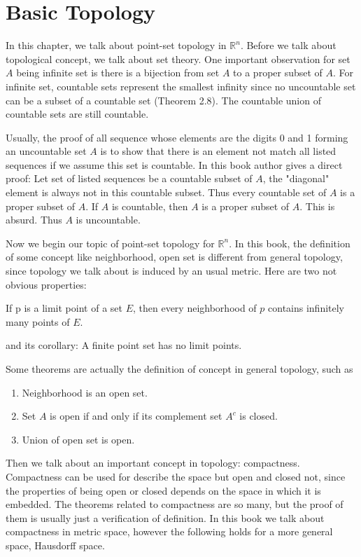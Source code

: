 \chapter{Basic Topology}
In this chapter, we talk about point-set topology in $\mathbb{R}^n$. Before we talk about topological concept, we talk about set theory. One important observation for set $A$ being infinite set is there is a bijection from set $A$ to a proper subset of $A$. For infinite set, countable sets represent the smallest infinity since no uncountable set can be a subset of a countable set (Theorem 2.8). The countable union of countable sets are still countable.\par
Usually, the proof of all sequence whose elements are the digits 0 and 1 forming an uncountable set $A$ is to show that there is an element not match all listed sequences if we assume this set is countable. In this book author gives a direct proof: Let set of listed sequences be a countable subset of $A$, the "diagonal" element is always not in this countable subset. Thus every countable set of $A$ is a proper subset of $A$. If $A$ is countable, then $A$ is a proper subset of $A$. This is absurd. Thus $A$ is uncountable.\par
Now we begin our topic of point-set topology for $\mathbb{R}^n$. In this book, the definition of some concept like neighborhood, open set is different from general topology, since topology we talk about is induced by an usual metric. Here are two not obvious properties:
\begin{theorem}[Theorem 2.20]
    If p is a limit point of a set $E$, then every neighborhood of $p$ contains infinitely many points of $E$.
\end{theorem}
and its corollary: A finite point set has no limit points.\par
Some theorems are actually the definition of concept in general topology, such as
\begin{enumerate}
    \item Neighborhood is an open set.
    \item Set $A$ is open if and only if its complement set $A^c$ is closed.
    \item Union of open set is open.
\end{enumerate}\par
Then we talk about an important concept in topology: compactness. Compactness can be used for describe the space but open and closed not, since the properties of being open or closed depends on the space in which it is embedded. The theorems related to compactness are so many, but the proof of them is usually just a verification of definition. In this book we talk about compactness in metric space, however the following holds for a more general space, Hausdorff space.
